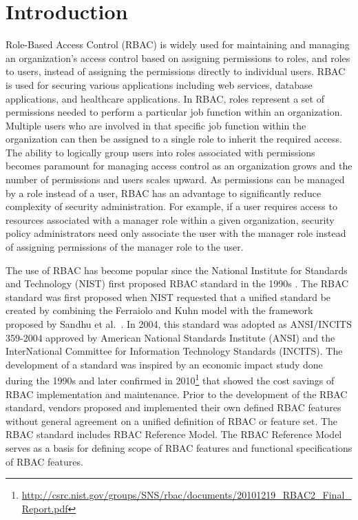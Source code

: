 \section{Introduction} \label{sec:introduction}

Role-Based Access Control (RBAC) is widely used for maintaining and managing an organization's 
access control based on assigning permissions to roles, and roles to users, instead of 
assigning the permissions directly to individual users.
RBAC is used for securing 
various applications including web services, database applications, and healthcare applications. 
In RBAC, roles represent a set of permissions needed to perform a particular job function within an organization.  
Multiple users who are involved in that specific job function within the organization can then be 
assigned to a single role to inherit the required access. 
The ability to logically group users into roles associated with permissions becomes paramount for managing access control as an organization grows
and the number of permissions and users scales upward.
As permissions can be managed by a role instead of a user, RBAC has an advantage to significantly reduce complexity of security
administration.
For example, if a user requires access to resources 
associated with a manager role within a given organization, security policy administrators need only associate the user with the manager role instead
of assigning permissions of the manager role to the user.


The use of RBAC has become popular since the National Institute for Standards and Technology (NIST) 
first proposed RBAC standard in the 1990s \cite{o20102010}.
The RBAC standard was first proposed when NIST 
requested that a unified standard be created by combining the Ferraiolo and Kuhn model \cite{ferraiolokuhn} with the framework 
proposed by Sandhu et al.~\cite{sandhu1996role}.  
In 2004, this standard was adopted as ANSI/INCITS 359-2004 approved by American National Standards Institute (ANSI) and the InterNational Committee for Information Technology Standards (INCITS). 
The development of a standard was inspired by an economic impact study done during the 1990s and later confirmed in 2010\footnote{\url{http://csrc.nist.gov/groups/SNS/rbac/documents/20101219_RBAC2_Final_Report.pdf}} that showed the cost savings of RBAC implementation and maintenance. 
Prior to the development of the RBAC standard, vendors proposed and implemented their own defined RBAC features without general agreement on a unified definition of RBAC or feature set. The RBAC standard includes RBAC Reference Model. The RBAC Reference Model serves as a basis for defining scope of RBAC features and functional specifications of RBAC features.


